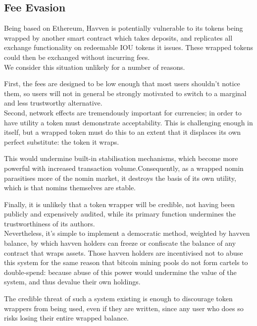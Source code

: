 \newpage

\subsection{Fee Evasion}

\noindent Being based on Ethereum, Havven is potentially vulnerable to its tokens being wrapped by another
smart contract which takes deposits, and replicates all exchange functionality on redeemable IOU tokens
it issues. These wrapped tokens could then be exchanged without incurring fees. \\

\noindent We consider this situation unlikely for a number of reasons.

\noindent First, the fees are designed to be low enough that most users
shouldn't notice them, so users will not in general be strongly motivated to switch
to a marginal and less trustworthy alternative. \\

\noindent Second, network effects are tremendously important for currencies; in order to have utility a token must demonstrate acceptability. This is challenging enough in itself, but a wrapped token must do this to an extent that it displaces its own perfect substitute: the token it wraps.

\noindent This would undermine built-in stabilisation mechanisms, which become more powerful with increased transaction volume.Consequently, as a wrapped nomin parasitises more of the nomin market, it destroys the basis of its own utility, which is that nomins themselves are stable.

\noindent Finally, it is unlikely that a token wrapper will be credible, not having been publicly and expensively audited, while its primary function undermines the trustworthiness of its authors. \\

\noindent Nevertheless, it's simple to implement a democratic method, weighted by havven balance,
by which havven holders can freeze or confiscate the balance of any contract that wraps assets.
Those havven holders are incentivised not to abuse this system for the same reason that
bitcoin mining pools do not form cartels to double-spend: because abuse of this power
would undermine the value of the system, and thus devalue their own holdings.

\noindent The credible threat of such a system existing is enough to discourage token wrappers
from being used, even if they are written, since any user who does so risks losing their
entire wrapped balance.


